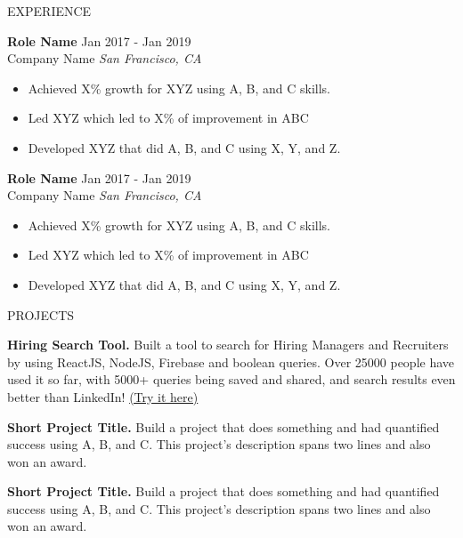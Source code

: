 \documentclass{resume} %
\begin{document}
\begin{rSection}{EXPERIENCE}

\textbf{Role Name} \hfill Jan 2017 - Jan 2019\\
Company Name \hfill \textit{San Francisco, CA}
 \begin{itemize}
    \itemsep -3pt {} 
     \item Achieved X\% growth for XYZ using A, B, and C skills.
     \item Led XYZ which led to X\% of improvement in ABC
    \item Developed XYZ that did A, B, and C using X, Y, and Z. 
 \end{itemize}
 
\textbf{Role Name} \hfill Jan 2017 - Jan 2019\\
Company Name \hfill \textit{San Francisco, CA}
 \begin{itemize}
    \itemsep -3pt {} 
     \item Achieved X\% growth for XYZ using A, B, and C skills.
     \item Led XYZ which led to X\% of improvement in ABC
    \item Developed XYZ that did A, B, and C using X, Y, and Z. 
 \end{itemize}

\end{rSection} 


\begin{rSection}{PROJECTS}
\vspace{-1.25em}
\item \textbf{Hiring Search Tool.} {Built a tool to search for Hiring Managers and Recruiters by using ReactJS, NodeJS, Firebase and boolean queries. Over 25000 people have used it so far, with 5000+ queries being saved and shared, and search results even better than LinkedIn! \href{https://hiring-search.careerflow.ai/}{(Try it here)}}
\item \textbf{Short Project Title.} {Build a project that does something and had quantified success using A, B, and C. This project's description spans two lines and also won an award.}
\item \textbf{Short Project Title.} {Build a project that does something and had quantified success using A, B, and C. This project's description spans two lines and also won an award.}
\end{rSection} 
\end{document}
